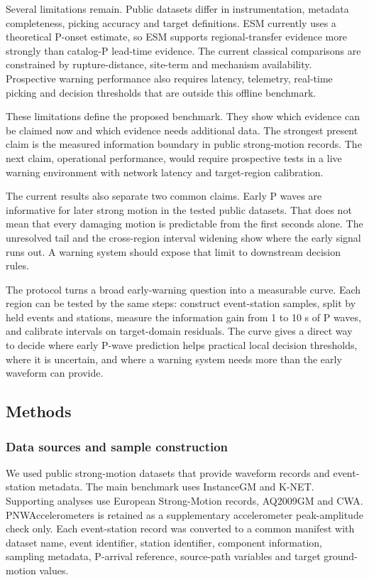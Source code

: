 \documentclass[
  10pt,
]{article}
\begin{document}
Several limitations remain. Public datasets differ in instrumentation,
metadata completeness, picking accuracy and target definitions. ESM
currently uses a theoretical P-onset estimate, so ESM supports
regional-transfer evidence more strongly than catalog-P lead-time
evidence. The current classical comparisons are constrained by
rupture-distance, site-term and mechanism availability. Prospective
warning performance also requires latency, telemetry, real-time picking
and decision thresholds that are outside this offline benchmark.

These limitations define the proposed benchmark. They show which
evidence can be claimed now and which evidence needs additional data.
The strongest present claim is the measured information boundary in
public strong-motion records. The next claim, operational performance,
would require prospective tests in a live warning environment with
network latency and target-region calibration.

The current results also separate two common claims. Early P waves are
informative for later strong motion in the tested public datasets. That
does not mean that every damaging motion is predictable from the first
seconds alone. The unresolved tail and the cross-region interval
widening show where the early signal runs out. A warning system should
expose that limit to downstream decision rules.

The protocol turns a broad early-warning question into a measurable
curve. Each region can be tested by the same steps: construct
event-station samples, split by held events and stations, measure the
information gain from 1 to 10 s of P waves, and calibrate intervals on
target-domain residuals. The curve gives a direct way to decide where
early P-wave prediction helps practical local decision thresholds, where
it is uncertain, and where a warning system needs more than the early
waveform can provide.

\subsection{Methods}\label{methods}

\subsubsection{Data sources and sample
construction}\label{data-sources-and-sample-construction}

We used public strong-motion datasets that provide waveform records and
event-station metadata. The main benchmark uses InstanceGM and K-NET.
Supporting analyses use European Strong-Motion records, AQ2009GM and
CWA. PNWAccelerometers is retained as a supplementary accelerometer
peak-amplitude check only. Each event-station record was converted to a
common manifest with dataset name, event identifier, station identifier,
component information, sampling metadata, P-arrival reference,
source-path variables and target ground-motion values.
\end{document}

